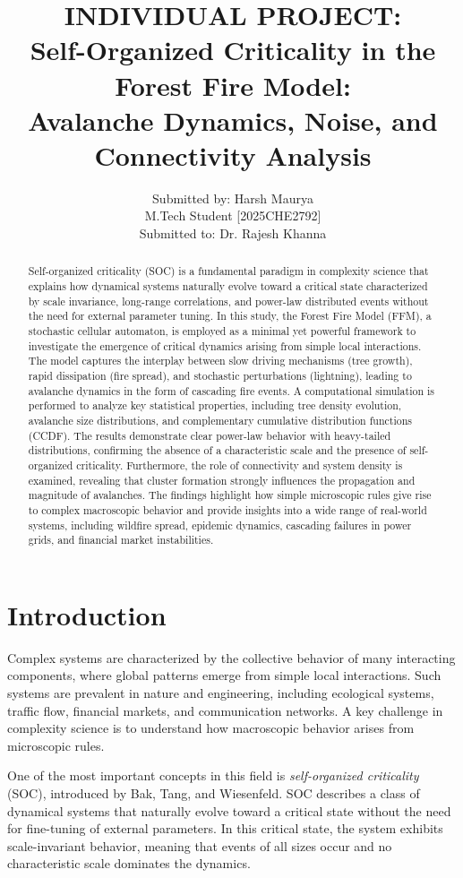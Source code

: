 \documentclass[12pt,a4paper]{article}
\title{\textbf{ INDIVIDUAL PROJECT:\\
Self-Organized Criticality in the Forest Fire Model:\\
Avalanche Dynamics, Noise, and Connectivity Analysis}}
\author{ Submitted by: Harsh Maurya\\
M.Tech Student [2025CHE2792] \\
Submitted to: Dr. Rajesh Khanna }
\date{}
\begin{document}
\maketitle
\newpage
\begin{abstract}
Self-organized criticality (SOC) is a fundamental paradigm in complexity science that explains how dynamical systems naturally evolve toward a critical state characterized by scale invariance, long-range correlations, and power-law distributed events without the need for external parameter tuning. In this study, the Forest Fire Model (FFM), a stochastic cellular automaton, is employed as a minimal yet powerful framework to investigate the emergence of critical dynamics arising from simple local interactions. The model captures the interplay between slow driving mechanisms (tree growth), rapid dissipation (fire spread), and stochastic perturbations (lightning), leading to avalanche dynamics in the form of cascading fire events. A computational simulation is performed to analyze key statistical properties, including tree density evolution, avalanche size distributions, and complementary cumulative distribution functions (CCDF). The results demonstrate clear power-law behavior with heavy-tailed distributions, confirming the absence of a characteristic scale and the presence of self-organized criticality. Furthermore, the role of connectivity and system density is examined, revealing that cluster formation strongly influences the propagation and magnitude of avalanches. The findings highlight how simple microscopic rules give rise to complex macroscopic behavior and provide insights into a wide range of real-world systems, including wildfire spread, epidemic dynamics, cascading failures in power grids, and financial market instabilities.
\end{abstract}

\newpage
\section{Introduction}

Complex systems are characterized by the collective behavior of many interacting components, where global patterns emerge from simple local interactions. Such systems are prevalent in nature and engineering, including ecological systems, traffic flow, financial markets, and communication networks. A key challenge in complexity science is to understand how macroscopic behavior arises from microscopic rules.

One of the most important concepts in this field is \textit{self-organized criticality} (SOC), introduced by Bak, Tang, and Wiesenfeld. SOC describes a class of dynamical systems that naturally evolve toward a critical state without the need for fine-tuning of external parameters. In this critical state, the system exhibits scale-invariant behavior, meaning that events of all sizes occur and no characteristic scale dominates the dynamics.
\end{document}
